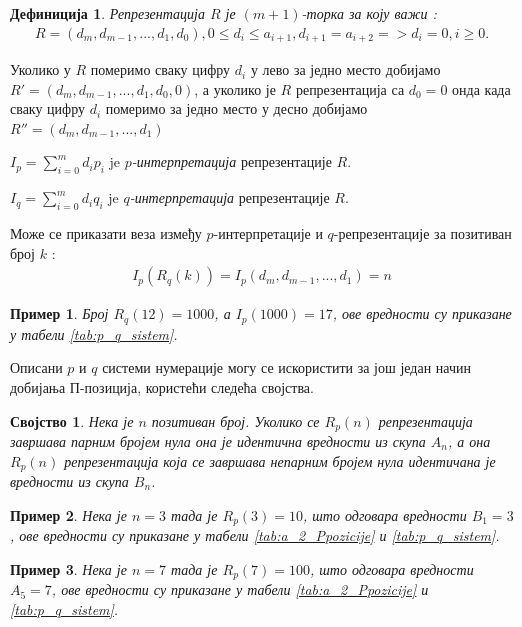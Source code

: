 \documentclass[a4paper]{article}
\newtheorem{example}{Пример}
\newtheorem{definition}{Дефиниција}
\newtheorem{property}{Својство}
\begin{document}
\begin{definition}
	Репрезентација $ R $ је  $ (m+1) $-торка за коју важи :
	\begin{eqnarray}
		R = (d_{m}, d_{m-1}, ... , d_{1}, d_{0}), 0 \le d_{i} \le a_{i+1}, d_{i+1} = a_{i+2} => d_{i} = 0, i \ge 0.
	\end{eqnarray}
\end{definition}

Уколико у $ R $ померимо сваку цифру $ d_{i} $ у лево за једно место добијамо $ R' = (d_{m}, d_{m-1}, ... , d_{1}, d_{0}, 0) $, а уколико је $ R $ репрезентација са $ d_{0} = 0 $ онда када сваку цифру $ d_{i} $ померимо за једно место у десно добијамо $ R'' = (d_{m}, d_{m-1}, ... , d_{1}) $ 

$ I_{p} = \sum_{i=0}^{m} d_{i}p_{i} $ je \textit{$ p $-интерпретација} репрезентације $ R $.

$ I_{q} = \sum_{i=0}^{m} d_{i}q_{i} $ je \textit{$ q $-интерпретација} репрезентације $ R $.

Може се приказати веза између $ p $-интерпретације и $ q $-репрезентације за позитиван број $ k $ :
\begin{eqnarray}
	I_{p}(R_{q}(k)) = I_{p}(d_{m}, d_{m-1}, ..., d_{1}) = n
\end{eqnarray} 

\begin{example}
	Број $ R_{q}(12) = 1000 $, а $ I_{p}(1000) = 17 $, ове вредности су приказане у табели \ref{tab:p_q_sistem}.
\end{example}

Описани $ p $ и $ q $ системи нумерације могу се искористити за још један начин добијања П-позиција, користећи следећа својства.

\begin{property}
	\label{prop:r_p_nule}
	Нека је $ n $ позитиван број. Уколико се $ R_p(n) $ репрезентација завршава парним бројем нула она је идентична вредности из скупа $ A_{n} $, а она $ R_p(n) $ репрезентација која се завршава непарним бројем нула идентичана је вредности из скупа $ B_{n} $.
\end{property}

\begin{example}
	Нека је $ n = 3 $ тада је $ R_{p}(3) = 10 $, што одговара вредности $ B_{1} = 3 $, ове вредности су приказане у табели \ref{tab:a_2_Ppozicije} и \ref{tab:p_q_sistem}.
\end{example}

\begin{example}
	Нека је $ n = 7 $ тада је $ R_{p}(7) = 100 $, што одговара вредности $ A_{5} = 7 $, ове вредности су приказане у табели \ref{tab:a_2_Ppozicije} и \ref{tab:p_q_sistem}.
\end{example}
\end{document}
